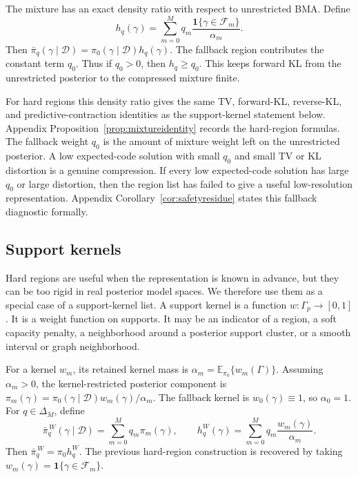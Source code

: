 \documentclass[twoside,11pt]{article}
\newcommand{\D}{\mathcal{D}}
\newcommand{\F}{\mathcal{F}}
\newcommand{\E}{\mathbb{E}}
\newcommand{\ind}{\mathbf{1}}
\begin{document}
The mixture has an exact density ratio with respect to unrestricted BMA. Define
\begin{equation}
h_q(\gamma) = \sum_{m=0}^M q_m\frac{\ind\{\gamma\in\F_m\}}{\alpha_m}. \label{eq:hq}
\end{equation}
Then \(\bar\pi_q(\gamma\mid\D)=\pi_0(\gamma\mid\D)h_q(\gamma)\). The fallback region contributes the constant term \(q_0\). Thus if \(q_0>0\), then \(h_q\ge q_0\). This keeps forward KL from the unrestricted posterior to the compressed mixture finite.

For hard regions this density ratio gives the same TV, forward-KL, reverse-KL, and predictive-contraction identities as the support-kernel statement below. Appendix Proposition~\ref{prop:mixtureidentity} records the hard-region formulas. The fallback weight \(q_0\) is the amount of mixture weight left on the unrestricted posterior. A low expected-code solution with small \(q_0\) and small TV or KL distortion is a genuine compression. If every low expected-code solution has large \(q_0\) or large distortion, then the region list has failed to give a useful low-resolution representation. Appendix Corollary~\ref{cor:safetyresidue} states this fallback diagnostic formally.

\subsection{Support kernels}
\label{subsec:supportkernels}

Hard regions are useful when the representation is known in advance, but they can be too rigid in real posterior model spaces. We therefore use them as a special case of a support-kernel list. A support kernel is a function \(w:\Gamma_p\to[0,1]\). It is a weight function on supports. It may be an indicator of a region, a soft capacity penalty, a neighborhood around a posterior support cluster, or a smooth interval or graph neighborhood.

For a kernel \(w_m\), its retained kernel mass is \(\alpha_m=\E_{\pi_0}\{w_m(\Gamma)\}\). Assuming \(\alpha_m>0\), the kernel-restricted posterior component is \(\pi_m(\gamma)=\pi_0(\gamma\mid\D)w_m(\gamma)/\alpha_m\). The fallback kernel is \(w_0(\gamma)\equiv1\), so \(\alpha_0=1\). For \(q\in\Delta_M\), define
\begin{equation}
\bar\pi_q^{\,W}(\gamma\mid\D) = \sum_{m=0}^M q_m\pi_m(\gamma), \qquad h_q^W(\gamma) = \sum_{m=0}^M q_m\frac{w_m(\gamma)}{\alpha_m}. \label{eq:kernelhq}
\end{equation}
Then $\bar\pi_q^{\,W}=\pi_0 h_q^W$. The previous hard-region construction is recovered by taking \(w_m(\gamma)=\ind\{\gamma\in\F_m\}\).
\end{document}

